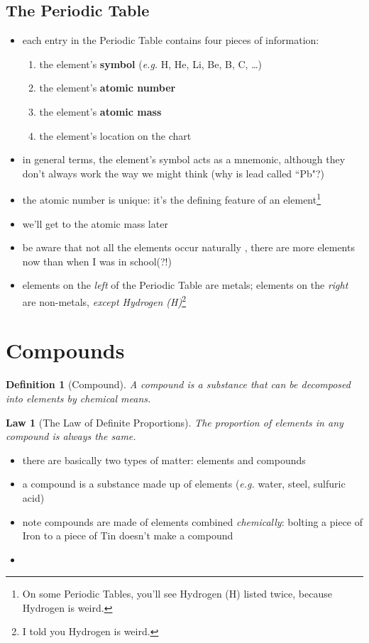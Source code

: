 \documentclass[11pt, oneside]{article}   	%
\newtheorem{definition}{Definition}
\newtheorem{law}{Law}
\begin{document}
\subsection{The Periodic Table}
\begin{itemize}
\item each entry in the Periodic Table contains four pieces of information:
\begin{enumerate}
\item the element's \textbf{symbol} (\emph{e.g.} H, He, Li, Be, B, C, \ldots)
\item the element's \textbf{atomic number}
\item the element's \textbf{atomic mass}
\item the element's location on the chart
\end{enumerate}
\item in general terms, the element's symbol acts as a mnemonic, although they don't always work the way we might think (why is lead called ``Pb"?)
\item the atomic number is unique: it's the defining feature of an element\footnote{On some Periodic Tables, you'll see Hydrogen (H) listed twice, because Hydrogen is weird.}
\item we'll get to the atomic mass later
\item be aware that not all the elements occur naturally \cite[p. 76]{wile-chem-2}, there are more elements now than when I was in school(?!)
\item elements on the \emph{left} of the Periodic Table are metals; elements on the \emph{right} are non-metals, \emph{except Hydrogen (H)}\footnote{I told you Hydrogen is weird.}
\end{itemize}

\section{Compounds}
\begin{definition}[Compound]
A compound is a substance that can be decomposed into elements by chemical means.
\end{definition}

\begin{law}[The Law of Definite Proportions]
The proportion of elements in any compound is always the same.
\end{law}

\begin{itemize}
\item there are basically two types of matter: elements and compounds
\item a compound is a substance made up of elements (\emph{e.g.} water, steel, sulfuric acid)
\item note compounds are made of elements combined \emph{chemically}: bolting a piece of Iron to a piece of Tin doesn't make a compound
\item 

\end{itemize}





\nocite{wile-chem-2}
{}

\end{document}
